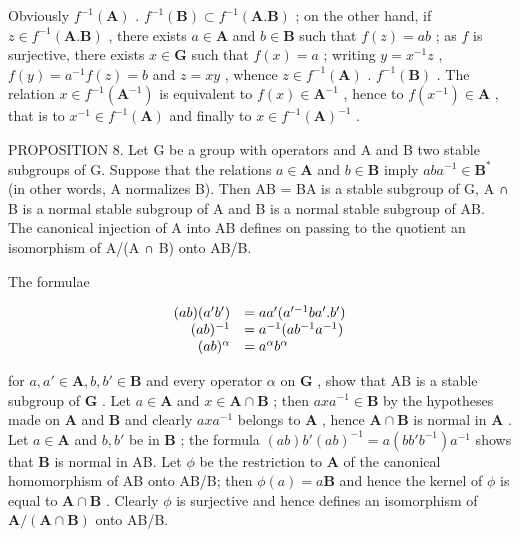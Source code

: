 Obviously \(f^{-1}(\mathbf{A})\) . \(f^{-1}(\mathbf{B}) \subset f^{-1}(\mathbf{A}.\mathbf{B})\) ; on the other hand, if \(z \in f^{-1}(\mathbf{A}.\mathbf{B})\) , there exists \(a \in \mathbf{A}\) and \(b \in \mathbf{B}\) such that \(f(z) = ab\) ; as \(f\) is surjective, there exists \(x \in \mathbf{G}\) such that \(f(x) = a\) ; writing \(y = x^{-1}z\) , \(f(y) = a^{-1}f(z) = b\) and \(z = xy\) , whence \(z \in f^{-1}(\mathbf{A})\) . \(f^{-1}(\mathbf{B})\) . The relation \(x \in f^{-1}(\mathbf{A}^{-1})\) is equivalent to \(f(x) \in \mathbf{A}^{-1}\) , hence to \(f(x^{-1}) \in \mathbf{A}\) , that is to \(x^{-1} \in f^{-1}(\mathbf{A})\) and finally to \(x \in f^{-1}(\mathbf{A})^{-1}\) .

PROPOSITION 8. Let G be a group with operators and A and B two stable subgroups of G. Suppose that the relations \(a \in \mathbf{A}\) and \(b \in \mathbf{B}\) imply \(aba^{-1} \in \mathbf{B}^*\) (in other words, A normalizes B). Then AB = BA is a stable subgroup of G, A ∩ B is a normal stable subgroup of A and B is a normal stable subgroup of AB. The canonical injection of A into AB defines on passing to the quotient an isomorphism of A/(A ∩ B) onto AB/B.

The formulae

\[
\begin{array}{r l} (a b) (a ^ {\prime} b ^ {\prime}) & = a a ^ {\prime} (a ^ {\prime - 1} b a ^ {\prime}. b ^ {\prime}) \\ (a b) ^ {- 1} & = a ^ {- 1} (a b ^ {- 1} a ^ {- 1}) \\ (a b) ^ {\alpha} & = a ^ {\alpha} b ^ {\alpha} \end{array}
\]

for \(a, a' \in \mathbf{A}, b, b' \in \mathbf{B}\) and every operator \(\alpha\) on \(\mathbf{G}\) , show that AB is a stable subgroup of \(\mathbf{G}\) . Let \(a \in \mathbf{A}\) and \(x \in \mathbf{A} \cap \mathbf{B}\) ; then \(axa^{-1} \in \mathbf{B}\) by the hypotheses made on \(\mathbf{A}\) and \(\mathbf{B}\) and clearly \(axa^{-1}\) belongs to \(\mathbf{A}\) , hence \(\mathbf{A} \cap \mathbf{B}\) is normal in \(\mathbf{A}\) . Let \(a \in \mathbf{A}\) and \(b, b'\) be in \(\mathbf{B}\) ; the formula \((ab)b'(ab)^{-1} = a(bb'b^{-1})a^{-1}\) shows that \(\mathbf{B}\) is normal in AB. Let \(\phi\) be the restriction to \(\mathbf{A}\) of the canonical homomorphism of AB onto AB/B; then \(\phi(a) = a\mathbf{B}\) and hence the kernel of \(\phi\) is equal to \(\mathbf{A} \cap \mathbf{B}\) . Clearly \(\phi\) is surjective and hence defines an isomorphism of \(\mathbf{A}/(\mathbf{A} \cap \mathbf{B})\) onto AB/B.

